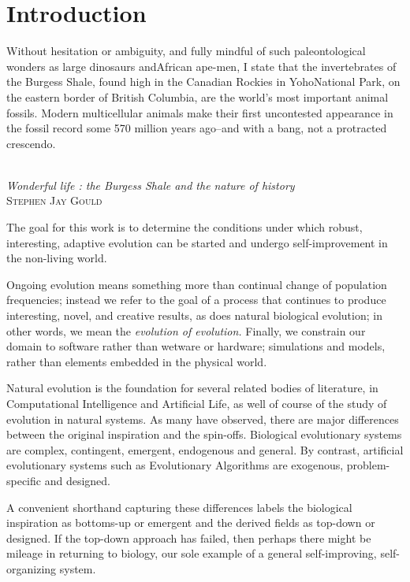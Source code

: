 \chapter{Introduction}\label{introduction}

\settowidth{\epigraphwidth}{Wonderful life : the Burgess Shale and the nature of history}
\epigraph{%
Without hesitation or ambiguity, and fully mindful of such paleontological wonders as large dinosaurs andAfrican ape-men, I state that the invertebrates of the Burgess Shale, found high in the Canadian Rockies in YohoNational Park, on the eastern border of British Columbia, are the world's most important animal fossils. Modern multicellular animals make their first uncontested appearance in the fossil record some 570 million years ago--and with a bang, not a protracted crescendo.}%
{\textit{\\Wonderful life : the Burgess Shale and the nature of history}\\\textsc{Stephen Jay Gould}}

The goal for this work is to determine the conditions under which robust, interesting, adaptive evolution can be started and undergo self-improvement in the non-living world. 

Ongoing evolution means something more than continual change of population frequencies; instead we refer to the goal of a process that continues to produce interesting, novel, and creative results, as does natural biological evolution; in other words, we mean the \textit{evolution of evolution.} Finally, we constrain our domain to software rather than wetware or hardware; simulations and models, rather than elements embedded in the physical world.

Natural evolution is the foundation for several related bodies of literature, in Computational Intelligence and Artificial Life, as well of course of the study of evolution in natural systems. As many have observed, there are major differences between the original inspiration and the spin-offs. Biological evolutionary systems are complex, contingent, emergent, endogenous and general. By contrast, artificial evolutionary systems such as Evolutionary Algorithms are exogenous, problem-specific and designed.

A convenient shorthand capturing these differences labels the biological inspiration as bottoms-up or emergent and the derived fields as top-down or designed. If the top-down approach has failed, then perhaps there might be mileage in returning to biology, our sole example of a general self-improving, self-organizing system.

